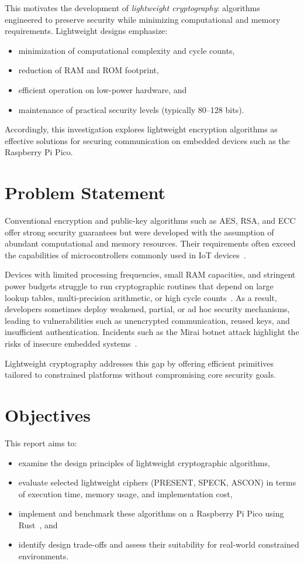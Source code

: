 \documentclass[12pt]{report}
\begin{document}
This motivates the development of \textit{lightweight cryptography}: algorithms engineered
to preserve security while minimizing computational and memory requirements. Lightweight
designs emphasize:
\begin{itemize}
    \item minimization of computational complexity and cycle counts,
    \item reduction of RAM and ROM footprint,
    \item efficient operation on low-power hardware, and
    \item maintenance of practical security levels (typically 80--128 bits).
\end{itemize}

Accordingly, this investigation explores lightweight encryption algorithms as effective
solutions for securing communication on embedded devices such as the Raspberry Pi Pico.

\section{Problem Statement}

Conventional encryption and public-key algorithms such as AES, RSA, and ECC offer strong security guarantees but
were developed with the assumption of abundant computational and memory resources. Their
requirements often exceed the capabilities of microcontrollers commonly used in IoT
devices~\cite{al2015iot}.

Devices with limited processing frequencies, small RAM capacities, and stringent power
budgets struggle to run cryptographic routines that depend on large lookup tables,
multi-precision arithmetic, or high cycle counts~\cite{al2015iot}. As a result, developers
sometimes deploy weakened, partial, or ad hoc security mechanisms, leading to vulnerabilities
such as unencrypted communication, reused keys, and insufficient authentication. Incidents
such as the Mirai botnet attack highlight the risks of insecure embedded systems~\cite{antonakakis2017mirai}.

Lightweight cryptography addresses this gap by offering efficient primitives tailored
to constrained platforms without compromising core security goals.

\section{Objectives}

This report aims to:
\begin{itemize}
    \item examine the design principles of lightweight cryptographic algorithms,
    \item evaluate selected lightweight ciphers (PRESENT, SPECK, ASCON) in terms of execution time, memory usage, and implementation cost,
    \item implement and benchmark these algorithms on a Raspberry Pi Pico using Rust~\cite{rustembedded2022}, and
    \item identify design trade-offs and assess their suitability for real-world constrained environments.
\end{itemize}
\end{document}
